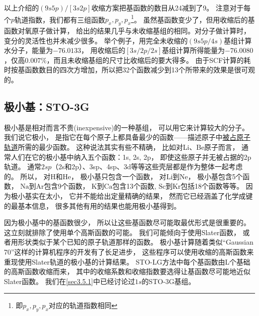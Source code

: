 以上介绍的$(9s5p)/[3s2p]$收缩方案把基函数的数目从24减到了9。
注意对于每个$p$轨道指数，我们都有三组函数$p_x,p_y,p_x$\footnote{
	即$p_x,p_y,p_x$对应的轨道指数相同
}。
虽然基函数变少了，但用收缩后的基函数对氧原子做计算，
给出的结果几乎与未收缩基组的相同。对分子做计算时，变分的灵活性也并未减少很多。
举个例子，用完全未收缩的$(9s5p/4s)$基组计算水分子，能量为$-76.0133$，
用收缩后的$[3s/2p/2s]$基组计算所得能量为$-76.0080$，仅高$0.007\%$，而且未收缩基组的尺寸比收缩后的要大得多。
由于SCF计算的耗时按基函数数目的四次方增加，所以把32个函数减少到13个所带来的效果是很可观的。

\subsection{极小基：STO-3G}
极小基是相对而言不贵(inexpensive)的一种基组，
可以用它来计算较大的分子。
我们说它极小，
是指它在每个原子上都具备最少的函数——描述原子中\underline{被占原子轨道}所需的最少函数。
这种说法其实有些不精确，
比如对Li、Be原子而言，
通常人们在它的极小基中纳入五个函数：1s, 2s, 2p，
即使这些原子并无被占据的2p轨道。
通常$2sp$（2s和2p）、3sp、4sp、3d等等这些壳层都是作为整体一起考虑的。
所以，
对$\mathrm{H}$和$\mathrm{He}$，
极小基只包含一个函数，
对$\mathrm{Li}$到$\mathrm{Ne}$，
极小基包含5个函数，
$\mathrm{Na}$到$\mathrm{Ar}$包含9个函数，
$\mathrm{K}$到$\mathrm{Ca}$包含13个函数,
$\mathrm{Sc}$到$\mathrm{Kr}$包括18个函数等等。
因为极小基实在太小，
它并不能给出定量精确的结果，
然而它已经涵盖了化学成键的最基本信息，
很多其他有用的结果也能用极小基得到。


因为极小基中的基函数很少，
所以让这些基函数尽可能取最优形式是很重要的。
这立刻就排除了使用单个高斯函数的可能。
我们可能倾向于使用Slater函数，
或者用形状类似于某个已知的原子轨道那样的函数。
极小基计算随着类似“Gaussian 70”这样的计算机程序的开发有了长足进步，
这些程序可以使用收缩的高斯函数来重现使用Slater轨道的极小基的计算结果。
STO-LG方法中每个基函数由L个基础的高斯函数收缩而来，
其中的收缩系数和收缩指数要选得让基函数尽可能地近似Slater函数。
我们在\ref{sec3.5.1}中已经讨论过$1s$的STO-3G基组。


